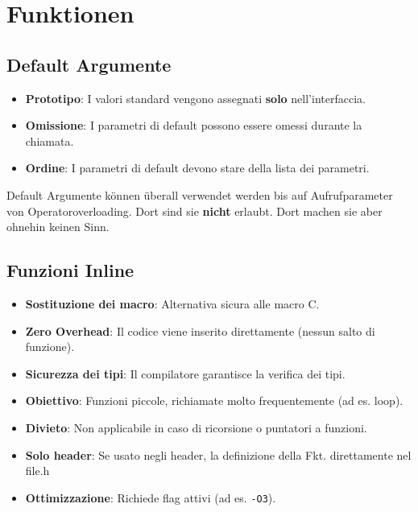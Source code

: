 \section{Funktionen}
\subsection{Default Argumente}
\begin{itemize}
    \item \textbf{Prototipo}: I valori standard vengono assegnati \textbf{solo} nell'interfaccia.
    \item \textbf{Omissione}: I parametri di default possono essere omessi durante la chiamata.
    \item \textbf{Ordine}: I parametri di default devono stare \textbf{} della lista dei parametri.\end{itemize}



Default Argumente können überall verwendet werden bis auf Aufrufparameter von Operatoroverloading. 
Dort sind sie \textbf{nicht} erlaubt. 
Dort machen sie aber ohnehin keinen Sinn. 

\subsection{Funzioni Inline}
\begin{itemize}
    \item \textbf{Sostituzione dei macro}: Alternativa sicura alle macro C.
    \item \textbf{Zero Overhead}: Il codice viene inserito direttamente (nessun salto di funzione).
    \item \textbf{Sicurezza dei tipi}: Il compilatore garantisce la verifica dei tipi.
    \item \textbf{Obiettivo}: Funzioni piccole, richiamate molto frequentemente (ad es. loop).
    \item \textbf{Divieto}: Non applicabile in caso di ricorsione o puntatori a funzioni.
    \item \textbf{Solo header}: Se usato negli header, la definizione della Fkt. direttamente nel file.h
    \item \textbf{Ottimizzazione}: Richiede flag attivi (ad es. \texttt{-O3}).\end{itemize}

